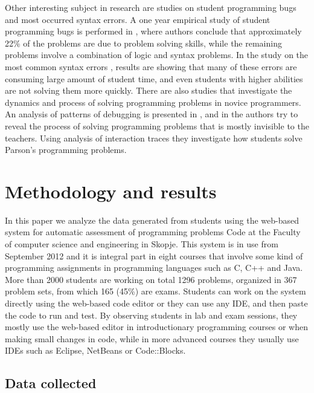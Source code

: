 \documentclass{llncs}
\begin{document}
Other interesting subject in research are studies on student programming bugs
and most occurred syntax errors. A one year empirical
study of student programming bugs is performed in \cite{bryce2010one}, where
authors conclude that approximately 22\% of the problems are due to problem solving
skills, while the remaining problems involve a combination of logic and syntax
problems. In the study on the most common syntax errors
\cite{denny2012all}, results are showing that many of these errors are
consuming large amount of student time, and even students with higher abilities
are not solving them more quickly. There are also studies that investigate
the dynamics and process of solving programming problems in novice programmers.
An analysis of patterns of debugging is presented in
\cite{ahmadzadeh2005analysis}, and in \cite{helminen2012students} the authors
try to reveal the process of solving programming problems that is mostly
invisible to the teachers. Using analysis of interaction traces they investigate
how students solve Parson's \cite{parsons2006parson} programming problems.

\section{Methodology and results}

In this paper we analyze the data generated from students using the
web-based system for automatic assessment of programming problems Code at the
Faculty of computer science and engineering in Skopje.
This system is in use from September 2012 and it is integral part in eight courses
that involve some kind of programming assignments in programming languages such
as C, C++ and Java. More than 2000 students are working on total 1296 problems,
organized in 367 problem sets, from which 165 (45\%) are exams. Students can
work on the system directly using the web-based code editor or they can use any
IDE, and then paste the code to run and test. By observing students in lab
and exam sessions, they mostly use the web-based editor in
introductionary programming courses or when making small changes in code, while
in more advanced courses they usually use IDEs such as Eclipse, NetBeans or
Code::Blocks.

\subsection{Data collected}
\end{document}
